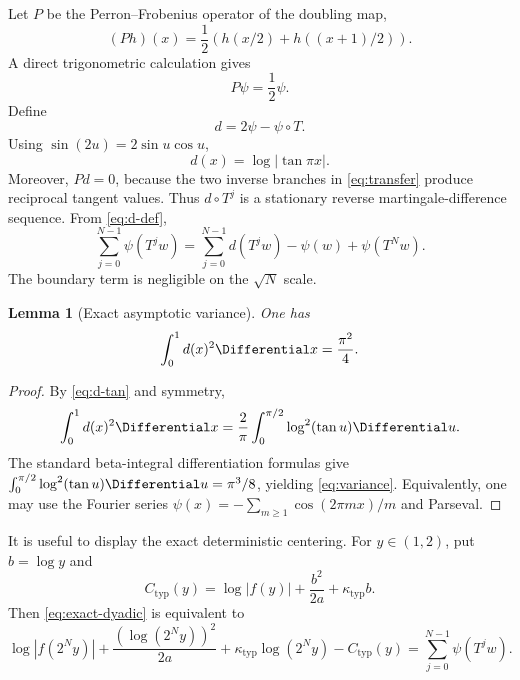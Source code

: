 \documentclass[11pt,oneside]{article}
\newtheorem{lemma}[theorem]{Lemma}
\theoremstyle{definition}
\theoremstyle{remark}
\newcommand{\T}{T}
\begin{document}
Let $P$ be the Perron--Frobenius operator of the doubling map,
\begin{equation}
 (Ph)(x)=\frac12\left(h(x/2)+h((x+1)/2)\right).             \label{eq:transfer}
\end{equation}
A direct trigonometric calculation gives
\begin{equation}
 P\psi=\frac12\psi.                                        \label{eq:Ppsi}
\end{equation}
Define
\begin{equation}
 d=2\psi-\psi\circ\T.
 \label{eq:d-def}
\end{equation}
Using $\sin(2u)=2\sin u\cos u$,
\begin{equation}
 d(x)=\log|\tan\pi x|.                                     \label{eq:d-tan}
\end{equation}
Moreover, $Pd=0$, because the two inverse branches in \eqref{eq:transfer}
produce reciprocal tangent values.  Thus $d\circ\T^j$ is a stationary reverse
martingale-difference sequence.  From \eqref{eq:d-def},
\begin{equation}
 \sum_{j=0}^{N-1}\psi(\T^jw)
 =\sum_{j=0}^{N-1}d(\T^jw)-\psi(w)+\psi(\T^Nw).            \label{eq:martingale-coboundary}
\end{equation}
The boundary term is negligible on the $\sqrt N$ scale.

\begin{lemma}[Exact asymptotic variance]
One has
\begin{equation}
 \int_0^1d(x)^2\Differential x=\frac{\pi^2}{4}.                      \label{eq:variance}
\end{equation}
\end{lemma}

\begin{proof}
By \eqref{eq:d-tan} and symmetry,
\[
 \int_0^1d(x)^2\Differential x
 =\frac2\pi\int_0^{\pi/2}\log^2(\tan u)\Differential u.
\]
The standard beta-integral differentiation formulas give
$\int_0^{\pi/2}\log^2(\tan u)\Differential u=\pi^3/8$, yielding
\eqref{eq:variance}.  Equivalently, one may use the Fourier series
$\psi(x)=-\sum_{m\ge1}\cos(2\pi mx)/m$ and Parseval.
\end{proof}

It is useful to display the exact deterministic centering.  For
$y\in(1,2)$, put $b=\log y$ and
\begin{equation}
 C_{\mathrm{typ}}(y)
 =\log|f(y)|+\frac{b^2}{2a}+\kappa_{\mathrm{typ}}b.          \label{eq:Ctyp}
\end{equation}
Then \eqref{eq:exact-dyadic} is equivalent to
\begin{equation}
 \log|f(2^Ny)|
 +\frac{(\log(2^Ny))^2}{2a}
 +\kappa_{\mathrm{typ}}\log(2^Ny)
 -C_{\mathrm{typ}}(y)
 =\sum_{j=0}^{N-1}\psi(\T^jw).                            \label{eq:exact-centered}
\end{equation}
\end{document}
